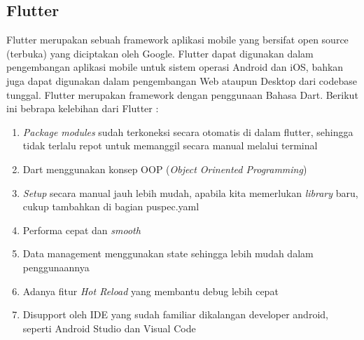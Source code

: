 \begin{flushleft}
\begin{justify}
        \subsection{Flutter}
        Flutter merupakan sebuah framework aplikasi mobile yang bersifat open source (terbuka) yang diciptakan oleh Google. Flutter dapat digunakan dalam pengembangan aplikasi mobile untuk sistem operasi Android dan iOS, bahkan juga dapat digunakan dalam pengembangan Web ataupun Desktop dari codebase tunggal. Flutter merupakan framework dengan penggunaan Bahasa Dart.
        Berikut ini bebrapa kelebihan dari Flutter \cite{flutter} :
        \begin{enumerate}
            \item \textit{Package modules} sudah terkoneksi secara otomatis di dalam flutter, sehingga tidak terlalu repot untuk memanggil secara manual melalui terminal
            \item Dart menggunakan konsep OOP (\textit{Object Orinented Programming})
            \item \textit{Setup} secara manual jauh lebih mudah, apabila kita memerlukan \textit{library} baru, cukup tambahkan di bagian puspec.yaml
            \item Performa cepat dan  \textit{smooth}
            \item Data management menggunakan state sehingga lebih mudah dalam penggunaannya
            \item Adanya fitur \textit{Hot Reload} yang membantu debug lebih cepat
            \item Disupport oleh IDE yang sudah familiar dikalangan developer android, seperti Android Studio dan Visual Code\\
            
        \end{enumerate}



\end{justify}
\end{flushleft}
